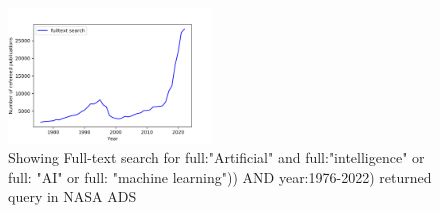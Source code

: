 \documentclass[final,5p,times,twocolumn,authoryear]{elsarticle}
\begin{document}
 \begin{figure}
    \centering
    \includegraphics[width=0.48\textwidth]{figs/fulltextai.png}
    \vspace*{-0.4cm}
    \caption{Showing Full-text search for  full:"Artificial" and full:"intelligence" or full: "AI" or full: "machine learning")) AND year:1976-2022) returned query in NASA ADS}
    \label{fig:ai}
\end{figure}
\end{document}
